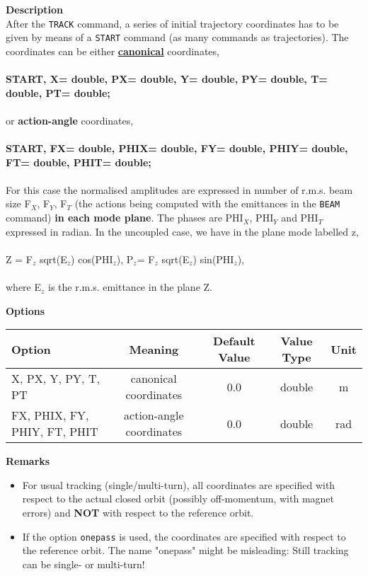 {\bf Description} \\
After the \texttt{TRACK} command, a series of initial trajectory
coordinates has to be given by means of a \texttt{START} command (as
many commands as trajectories). The coordinates can be either
\href{../Introduction/tables.html#canon}{\textbf{canonical}}
coordinates,  
\\
\\\textbf{START, X= double, PX= double, Y= double, PY= double, T= double, PT= double; }
\\
\\
or \textbf{action-angle} coordinates,
\\
\\\textbf{START, FX= double, PHIX= double, FY= double, PHIY= double, FT= double, PHIT= double; }
\\
\\
For this case the normalised amplitudes are expressed in number 
of r.m.s. beam size F$_X$, F$_Y$, F$_T$ (the actions being computed with
the  emittances in the \texttt{BEAM} command) \textbf{in each mode
  plane}. The phases are PHI$_X$, PHI$_Y$ and PHI$_T$ expressed in
radian. In the uncoupled case, we have in the plane mode labelled z,  
\\
\\
Z = F$_z$ sqrt(E$_z$) cos(PHI$_z$),    
P$_z$= F$_z$ sqrt(E$_z$) sin(PHI$_z$), 
\\
\\ 
where E$_z$ is the r.m.s. emittance in the plane Z.

{\bf Options}
\begin{tabular}{p{3cm} cccc}
   \hline 
   \textbf{Option} & \textbf{Meaning} & \textbf{Default Value} & \textbf{Value Type} & \textbf{Unit} \\ 
   \hline
   X, PX, Y, PY, T, PT & canonical coordinates & 0.0 & double & m \\ 
   \hline
   FX, PHIX, FY, PHIY, FT, PHIT & action-angle coordinates & 0.0 & double & rad \\ 
   \hline
\end{tabular}

{\bf Remarks} 
\begin{itemize}
   \item For usual tracking (single/multi-turn), all coordinates are
     specified with respect to the actual closed orbit (possibly
     off-momentum, with magnet errors) and \textbf{NOT} with respect to
     the reference orbit. 
   \item If the option \texttt{onepass} is used, the coordinates are
     specified with respect to the reference orbit. The name "onepass"
     might be misleading: Still tracking can be single- or multi-turn!   
            
\end{itemize}
          

